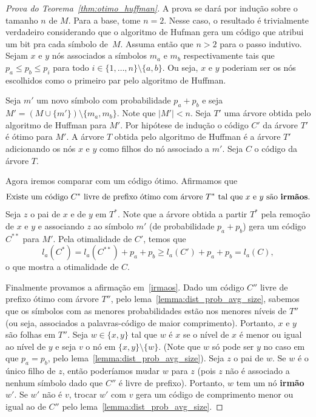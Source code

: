 \begin{proof}[Prova do Teorema~\ref{thm:otimo_huffman}]
A prova se dará por indução sobre o tamanho $n$ de $M$. Para a base,
tome $n=2$. Nesse caso, o resultado é trivialmente verdadeiro
considerando que o algoritmo de Hufman gera um código que atribui um
bit pra cada símbolo de~$M$. Assuma então que $n>2$ para o passo
indutivo. Sejam $x$ e $y$ nós associados a símbolos $m_a$ e $m_b$
respectivamente tais que $p_a \leq p_b \leq p_i$ para todo $i \in
\{1,\dotsc,n\}\setminus\{a,b\}$. Ou seja, $x$ e $y$ poderiam ser os
nós escolhidos como o primeiro par pelo algoritmo de Huffman.

Seja $m'$ um novo símbolo com probabilidade $p_a+p_b$ e seja $M' =
(M\cup\{m'\})\setminus\{m_a, m_b\}$. Note que $|M'| < n$. Seja $T'$
uma árvore obtida pelo algoritmo de Huffman para $M'$. Por hipótese de
indução o código $C'$ da árvore $T'$ é ótimo para $M'$. A árvore $T$
obtida pelo algoritmo de Huffman é a árvore $T'$ adicionando os nós
$x$ e $y$ como filhos do nó associado a $m'$. Seja $C$ o código da
árvore $T$.

Agora iremos comparar com um código ótimo. Afirmamos que
\begin{equation}
 \label{irmaos}
\text{Existe um código $C^*$ livre de prefixo ótimo com árvore $T^*$
  tal que $x$ e $y$ são \textbf{irmãos}.}
\end{equation}
Seja $z$ o pai de $x$ e de $y$ em $T^*$. Note que a árvore obtida a
partir $T^*$ pela remoção de $x$ e $y$ e associando $z$ ao símbolo
$m'$ (de probabilidade $p_a+p_b$) gera um código $C^{**}$ para $M'$. Pela
otimalidade de $C'$, temos que
\begin{equation*}
  l_a(C^*)
  =
   l_a(C^{**})+p_a+p_b
  \geq
  l_a(C')+p_a+p_b
  =
  l_a(C),
\end{equation*}
o que mostra a otimalidade de $C$.


Finalmente provamos a afirmação em~\eqref{irmaos}.  Dado um código
$C''$ livre de prefixo ótimo com árvore $T''$, pelo
lema~\ref{lemma:dist_prob_avg_size}, sabemos que os símbolos com as
menores probabilidades estão nos menores níveis de $T''$ (ou seja,
associados a palavras-código de maior comprimento). Portanto, $x$ e
$y$ são folhas em $T''$. Seja $w \in\{x,y\}$ tal que $w$ é $x$ se o
nível de $x$ é menor ou igual ao nível de $y$ e seja $v$ o nó em
$\{x,y\}\setminus\{w\}$. (Note que $w$ só pode ser $y$ no caso em que
$p_a = p_b$, pelo lema~\ref{lemma:dist_prob_avg_size}). Seja $z$ o pai
de $w$. Se $w$ é o único filho de $z$, então poderíamos mudar $w$ para
$z$ (pois $z$ não é associado a nenhum símbolo dado que $C''$ é livre
de prefixo). Portanto, $w$ tem um nó \textbf{irmão} $w'$. Se $w'$ não
é $v$, trocar $w'$ com $v$ gera um código de comprimento menor ou
igual ao de $C''$ pelo lema~\ref{lemma:dist_prob_avg_size}. 
\end{proof}


